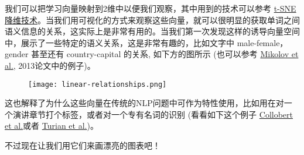 我们可以把学习向量映射到2维中以便我们观察，其中用到的技术可以参考 \href{http://lvdmaaten.github.io/tsne/}{t-SNE 降维技术}。当我们用可视化的方式来观察这些向量，就可以很明显的获取单词之间语义信息的关系，这实际上是非常有用的。当我们第一次发现这样的诱导向量空间中，展示了一些特定的语义关系，这是非常有趣的，比如文字中 male-female，gender 甚至还有 country-capital 的关系, 如下方的图所示 (也可以参考 \href{http://www.aclweb.org/anthology/N13-1090}{Mikolov et al.}, 2013论文中的例子)。
\begin{center}
\begin{figure}[H]
\texttt{[image: linear-relationships.png]}
\end{figure}
\end{center}
这也解释了为什么这些向量在传统的NLP问题中可作为特性使用，比如用在对一个演讲章节打个标签，或者对一个专有名词的识别 (看看如下这个例子 \href{https://arxiv.org/pdf/1103.0398v1.pdf}{Collobert et al.}或者 \href{http://www.aclweb.org/anthology/P10-1040}{Turian et al.})。

不过现在让我们用它们来画漂亮的图表吧！

